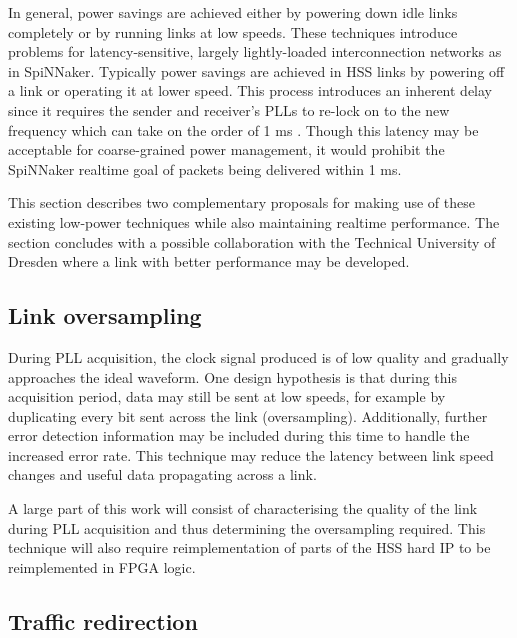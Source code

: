 		In general, power savings are achieved either by powering down idle links
		completely or by running links at low speeds. These techniques introduce
		problems for latency-sensitive, largely lightly-loaded interconnection
		networks as in SpiNNaker. Typically power savings are achieved in HSS links
		by powering off a link or operating it at lower speed. This process
		introduces an inherent delay since it requires the sender and receiver's
		PLLs to re-lock on to the new frequency which can take on the order of 1 ms
		\cite{xilinx14}. Though this latency may be acceptable for coarse-grained
		power management, it would prohibit the SpiNNaker realtime goal of packets
		being delivered within 1 ms.
		
		This section describes two complementary proposals for making use of these
		existing low-power techniques while also maintaining realtime performance.
		The section concludes with a possible collaboration with the Technical
		University of Dresden where a link with better performance may be developed.
		
		\subsection{Link oversampling}
			
			
			During PLL acquisition, the clock signal produced is of low quality and
			gradually approaches the ideal waveform. One design hypothesis is that
			during this acquisition period, data may still be sent at low speeds, for
			example by duplicating every bit sent across the link (oversampling).
			Additionally, further error detection information may be included during
			this time to handle the increased error rate. This technique may reduce
			the latency between link speed changes and useful data propagating across
			a link.
			
			A large part of this work will consist of characterising the quality of
			the link during PLL acquisition and thus determining the oversampling
			required. This technique will also require reimplementation of parts of
			the HSS hard IP to be reimplemented in FPGA logic.
		
		\subsection{Traffic redirection}
			
			
